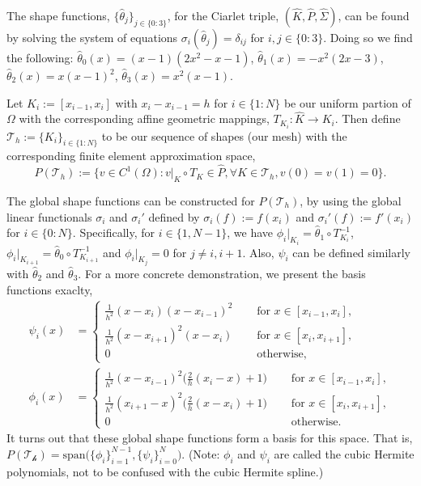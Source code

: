 \documentclass[11pt]{article}
\begin{document}
The shape functions, $\{\widehat{\theta}_j\}_{j\in\{0:3\}}$, for the Ciarlet triple, $(\widehat{K},\widehat{P},\widehat{\Sigma})$, can be found by solving the system of equations $\sigma_i(\widehat{\theta}_j) = \delta_{ij}$ for $i,j \in \{0:3\}$. 
Doing so we find the following: $\widehat{\theta}_0(x) = (x-1)(2x^2 - x - 1)$, $\widehat{\theta}_1(x) = -x^2(2x-3)$, $\widehat{\theta}_2(x) = x(x-1)^2$, $\widehat{\theta}_3(x) = x^2(x-1)$.

Let $K_i := [x_{i-1}, x_i]$ with $x_i - x_{i-1} = h$ for $i \in \{1:N\}$ be our uniform partion of $\Omega$ with the corresponding affine geometric mappings, $T_{K_i} : \widehat{K} \to K_i$. 
Then define $\mathcal{T}_h := \{K_i\}_{i\in\{1:N\}}$ to be our sequence of shapes (our mesh) with the corresponding finite element approximation space,
\begin{equation}
	P(\mathcal{T}_h) := \{ v \in C^1(\Omega) : v|_K \circ T_K \in \widehat{P}, \forall K \in \mathcal{T}_h, v(0) = v(1) = 0 \}.
\end{equation}

The global shape functions can be constructed for $P(\mathcal{T}_h)$, by using the global linear functionals $\sigma_i$ and $\sigma_i'$ defined by $\sigma_i(f) := f(x_i)$ and $\sigma_i'(f) := f'(x_i)$ for $i \in \{0:N\}$.
Specifically, for $i \in \{1, N-1\}$, we have $\phi_i|_{K_i} = \widehat{\theta}_1 \circ T^{-1}_{K_i}$, $\phi_i|_{K_{i+1}} = \widehat{\theta}_0\circ T^{-1}_{K_{i+1}}$ and $\phi_i|_{K_j} = 0$ for $j \neq i, i+1$.
Also, $\psi_i$ can be defined similarly with $\widehat{\theta}_2$ and $\widehat{\theta}_3$.
For a more concrete demonstration, we present the basis functions exaclty,
\begin{align}
    \psi_i(x) &= \begin{cases}
    \frac{1}{h^2}(x - x_i)(x - x_{i-1})^2 &\quad \text{ for } x \in [x_{i-1}, x_i], \\
    \frac{1}{h^2} (x - x_{i+1})^2(x - x_i) &\quad \text{ for } x \in [x_i, x_{i+1}], \\
	    0 &\quad \text{ otherwise},
    \end{cases} \\
    \phi_i(x) &= \begin{cases}
    \frac{1}{h^2}(x - x_{i-1})^2 \big(\frac{2}{h}(x_i - x) + 1\big) &\quad \text{ for } x \in [x_{i-1},x_i], \\
    \frac{1}{h^2}(x_{i+1}-x)^2 \big( \frac{2}{h}(x - x_i) + 1 \big) &\quad \text{ for } x \in [x_i, x_{i+1}], \\
    0 &\quad \text{ otherwise}.
    \end{cases} 
\end{align}
It turns out that these global shape functions form a basis for this space.
That is, $P(\mathcal{T_h}) = \text{span}\big(\{\phi_i\}_{i=1}^{N-1}, \{\psi_i\}_{i=0}^N \big)$. 
(Note: $\phi_i$ and $\psi_i$ are called the cubic Hermite polynomials, not to be confused with the cubic Hermite spline.)
\end{document}
